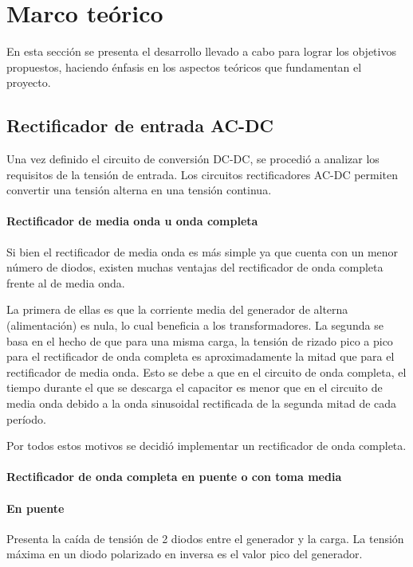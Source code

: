 \section{Marco teórico}

En esta sección se presenta el desarrollo llevado a cabo para lograr los objetivos propuestos, haciendo énfasis en los aspectos teóricos que fundamentan el proyecto.

\subsection{Rectificador de entrada AC-DC}
Una vez definido el circuito de conversión DC-DC, se procedió a analizar los requisitos de la tensión de entrada. 
Los circuitos rectificadores AC-DC permiten convertir una tensión alterna en una tensión continua.

\paragraph{Rectificador de media onda u onda completa}

Si bien el rectificador de media onda es más simple ya que cuenta con un menor número de diodos, existen muchas ventajas del rectificador de onda completa frente al de media onda.

La primera de ellas es que la corriente media del generador de alterna (alimentación) es nula, lo cual beneficia a los transformadores. 
La segunda se basa en el hecho de que para una misma carga,
la tensión de rizado pico a pico para el rectificador de onda completa es
aproximadamente la mitad que para el rectificador de media onda. 
Esto se debe a que en el circuito de onda completa,
el tiempo durante el que se descarga el capacitor es menor que en el circuito de media onda
debido a la onda sinusoidal rectificada de la segunda mitad de cada período. 

Por todos estos motivos se decidió implementar un rectificador de onda completa.

\paragraph{Rectificador de onda completa en puente o con toma media}

\paragraph{En puente}

Presenta la caída de tensión de 2 diodos entre el generador y la carga. 
La tensión máxima en un diodo polarizado en inversa es el valor pico del generador.

